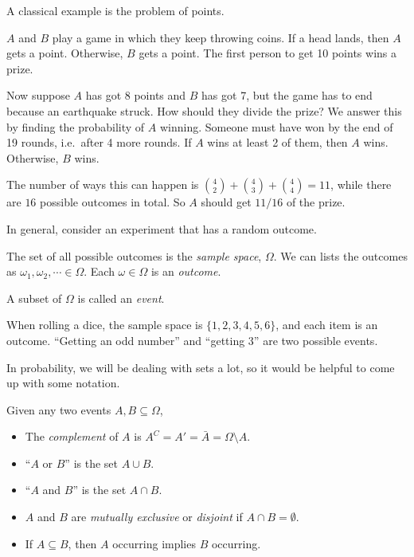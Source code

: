 \documentclass[a4paper]{article}
\begin{document}
A classical example is the problem of points.

\begin{eg}
  $A$ and $B$ play a game in which they keep throwing coins. If a head lands, then $A$ gets a point. Otherwise, $B$ gets a point. The first person to get 10 points wins a prize.

  Now suppose $A$ has got 8 points and $B$ has got 7, but the game has to end because an earthquake struck. How should they divide the prize? We answer this by finding the probability of $A$ winning. Someone must have won by the end of 19 rounds, i.e.\ after 4 more rounds. If $A$ wins at least 2 of them, then $A$ wins. Otherwise, $B$ wins.

  The number of ways this can happen is $\binom{4}{2} + \binom{4}{3} + \binom{4}{4} = 11$, while there are $16$ possible outcomes in total. So $A$ should get $11/16$ of the prize.
\end{eg}

In general, consider an experiment that has a random outcome.

\begin{defi}
  The set of all possible outcomes is the \emph{sample space}, $\Omega$. We can lists the outcomes as $\omega_1, \omega_2, \cdots \in \Omega$. Each $\omega \in \Omega$ is an \emph{outcome}.
\end{defi}

\begin{defi}[Event]
  A subset of $\Omega$ is called an \emph{event}.
\end{defi}

\begin{eg}
  When rolling a dice, the sample space is $\{1, 2, 3, 4, 5, 6\}$, and each item is an outcome. ``Getting an odd number'' and ``getting 3'' are two possible events.
\end{eg}

In probability, we will be dealing with sets a lot, so it would be helpful to come up with some notation.
\begin{defi}
  Given any two events $A, B\subseteq \Omega$,
  \begin{itemize}
    \item The \emph{complement} of $A$ is $A^C = A' = \bar A = \Omega\setminus A$.
    \item ``$A$ or $B$'' is the set $A\cup B$.
    \item ``$A$ and $B$'' is the set $A\cap B$.
    \item $A$ and $B$ are \emph{mutually exclusive} or \emph{disjoint} if $A\cap B = \emptyset$.
    \item If $A\subseteq B$, then $A$ occurring implies $B$ occurring.
  \end{itemize}
\end{defi}
\end{document}
